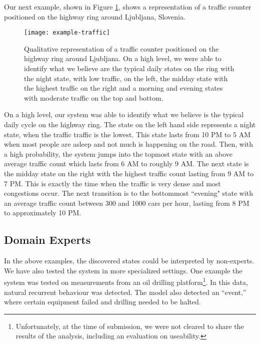 Our next example, shown in Figure \ref{fig:example-traffic}, shows a representation of a traffic counter positioned on the highway ring around Ljubljana, Slovenia.
\begin{figure}[h!]
	\centering
	\texttt{[image: example-traffic]}
	\caption{Qualitative representation of a traffic counter positioned on the highway ring around Ljubljana. On a high level, we were able to identify what we believe are the typical daily states on the ring with the night state, with low traffic, on the left, the midday state with the highest traffic on the right and a morning and evening states with moderate traffic on the top and bottom. }
	\label{fig:example-traffic}
\end{figure}
On a high level, our system was able to identify what we believe is the typical daily cycle on the highway ring.
The state on the left hand side represents a night state, when the traffic traffic is the lowest. This state
lasts from 10 PM to 5 AM when most people are asleep and not much is happening on the road. Then, with a high 
probability, the system jumps into the topmost state with an above average traffic count which lasts from 6 AM
to roughly 9 AM. The next state is the midday state on the right with the highest traffic count lasting from 9 AM
to 7 PM. This is exactly the time when the traffic is very dense and most congestions occur. The next transition
is to the bottommost ``evening" state with an average traffic count between 300 and 1000 cars per hour,
lasting from 8 PM to approximately 10 PM. 


\subsection{Domain Experts}
In the above examples, the discovered states could be interpreted by non-experts. We have also tested the system in more specialized settings. One example the system was tested on measurements from an oil drilling platform\footnote{Unfortunately, at the time of submission, we were not cleared to share the results of the analysis, including an evaluation on useability.}. In this data, natural recurrent behaviour was detected.  The model also detected an ``event,'' where certain equipment failed and drilling needed to be halted.  


